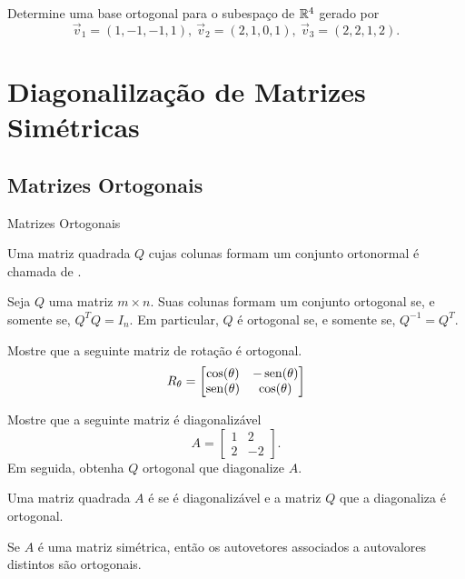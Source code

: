 \begin{frame}[label=orto]{}

\begin{casa}
Determine uma base ortogonal para o subespaço de $\mathbb{R}^4$ gerado por
\[\vec{v}_1=(1,-1,-1,1),\ \vec{v}_2=(2,1,0,1),\ \vec{v}_3=(2,2,1,2).\]
\end{casa}
\end{frame}



\section{Diagonalilzação de Matrizes Simétricas}


\subsection*{Matrizes Ortogonais}
\begin{frame}[label=orto]{Matrizes Ortogonais}

\begin{defin}
Uma matriz quadrada $Q$ cujas colunas formam um conjunto ortonormal é chamada 
de .
\end{defin}

\begin{teo}
Seja $Q$ uma matriz $m\times n$. Suas colunas formam um conjunto ortogonal se, 
e somente se, $Q^TQ=I_n$. Em particular, $Q$ é ortogonal se, e somente se, $Q^{-1}=Q^T$.
\end{teo}

\begin{exe}
Mostre que  a seguinte matriz de rotação é ortogonal.
\[R_\theta= 
\begin{bmatrix}
\cos(\theta) & -\operatorname{sen}(\theta)\\
\operatorname{sen}(\theta) & \cos(\theta)
\end{bmatrix}
\]
\end{exe}

\end{frame}


\begin{frame}[label=orto]{}

\begin{exe}
Mostre que  a seguinte matriz é diagonalizável
\[A=
\begin{bmatrix}
1& 2\\ 2 & -2
\end{bmatrix}.
\]
Em seguida, obtenha $Q$ ortogonal que diagonalize $A$.
\end{exe}

\begin{defin}
Uma matriz quadrada $A$ é  se é 
diagonalizável e a matriz $Q$ que a diagonaliza é ortogonal.
\end{defin}

\begin{prop}
Se $A$ é uma matriz simétrica, então os autovetores associados a autovalores distintos são ortogonais.
\end{prop}

\end{frame}

